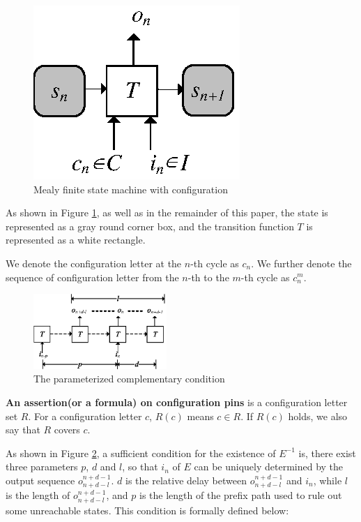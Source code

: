 \documentclass{sig-alternate}
\begin{document}
\begin{figure}[t]
\centering
\includegraphics{mealy}
\caption{Mealy finite state machine with configuration}
\label{mealy}
\end{figure}

As shown in Figure \ref{mealy},
as well as in the remainder of this paper,
the state is represented as a gray round corner box,
and the transition function $T$ is represented as a white rectangle.

We denote the configuration letter at the $n$-th cycle as $c_n$.
We further denote the sequence of configuration letter from the $n$-th to the $m$-th cycle as $c_n^m$.

\begin{figure}[b]
\begin{center}
\includegraphics[width=0.45\textwidth]{t1}
\end{center}
\caption{The parameterized complementary condition}
  \label{t1}
\end{figure}

\begin{definition11}\label{def_ass}
\textbf{An assertion(or a formula) on configuration pins} is a configuration letter set $R$.
For a configuration letter $c$,
$R(c)$ means $c\in R$.
If $R(c)$ holds,
we also say that $R$ covers $c$.
\end{definition11}


As shown in Figure \ref{t1},
a sufficient condition for the existence of $E^{-1}$ is,
there exist three parameters $p$, $d$ and $l$,
so that $i_n$ of $E$ can be uniquely determined by the output sequence $o_{n+d-l}^{n+d-1}$.
$d$ is the relative delay between $o_{n+d-l}^{n+d-1}$ and $i_n$,
while $l$ is the length of $o_{n+d-l}^{n+d-1}$,
and $p$ is the length of the prefix path used to rule out some unreachable states.
This condition is formally defined below:
\end{document}
